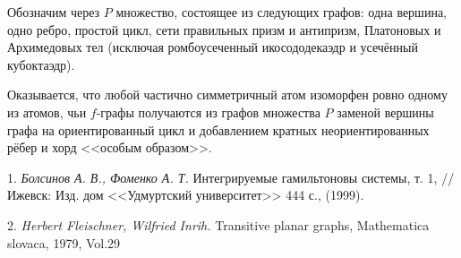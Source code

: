 	Обозначим через $P$ множество, состоящее из следующих графов: одна вершина, одно ребро, простой цикл, сети правильных призм и антипризм, Платоновых и Архимедовых тел (исключая ромбоусеченный икосододекаэдр и усечённый кубоктаэдр).



 Оказывается, что любой частично симметричный атом изоморфен ровно одному из атомов, чьи $f$-графы получаются из графов множества $P$ заменой вершины графа на ориентированный цикл и добавлением кратных неориентированных рёбер и хорд <<особым образом>>.






\litlist

1. {\it Болсинов А. В., Фоменко А. Т.} Интегрируемые гамильтоновы системы, т. 1, // Ижевск: Изд. дом <<Удмуртский университет>> 444 с., (1999).

2. {\it Herbert Fleischner, Wilfried Inrih.} Transitive planar graphs, Mathematica slovaca, 1979, Vol.29
